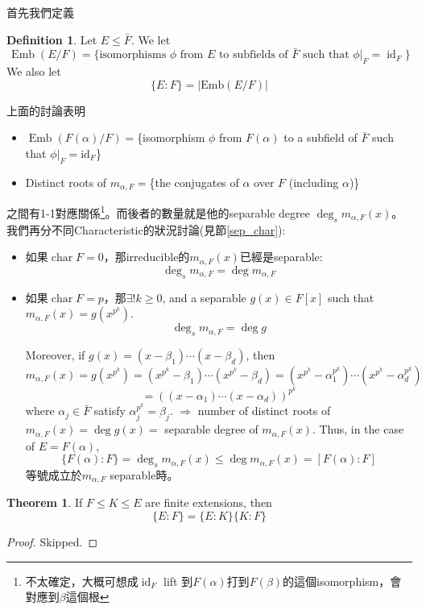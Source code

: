 \documentclass[12pt]{article}
\theoremstyle{definition}
\newtheorem{thm}{Theorem}
\newtheorem{dfn}{Definition}
\DeclareMathOperator{\Char}{char}
\DeclareMathOperator{\id}{id}
\DeclareMathOperator{\Emb}{Emb}
\begin{document}
首先我們定義
\begin{dfn}
	Let $E \leq \bar{F}$. We let
	\[
		\Emb(E/F) =\{
		\text{isomorphisms $\phi$ from $E$ to subfields of $\bar{F}$ such that $\phi|_F = \id_F$}
		\}
	\]
	We also let
	\[\{E:F\} = |\text{Emb}(E/F)|\]
\end{dfn}


上面的討論表明
\begin{itemize}
	\item $\Emb(F(\alpha)/F)=$\{isomorphism $\phi$ from $F(\alpha)$ to a subfield of $\bar{F}$ such that $\phi|_F = \text{id}_F$\}
	\item Distinct roots of $m_{\alpha,F}=$\{the conjugates of $\alpha$ over $F$ (including $\alpha$)\}
\end{itemize}
之間有1-1對應關係\footnote{不太確定，大概可想成$\id_F$ lift 到$F(\alpha)$打到$F(\beta)$的這個isomorphism，會對應到$\beta$這個根}。而後者的數量就是他的separable degree $\deg_s m_{\alpha, F}(x)$。我們再分不同Characteristic的狀況討論(見節\ref{sep_char}):

\begin{itemize}
	\item 如果$\Char F=0$，那irreducible的$m_{\alpha,F}(x)$已經是separable:
	      \[\deg_s m_{\alpha,F} = \deg m_{\alpha,F}\]
	\item 如果$\Char F=p$，那$\exists ! k \geq 0$, and a separable $g(x) \in F[x]$ such that $m_{\alpha, F}(x) = g(x^{p^k})$.
	      \[\deg_s m_{\alpha,F}= \deg g\]


	      Moreover, if $g(x) = (x - \beta_1) \cdots (x - \beta_d)$, then
	      \[
		      m_{\alpha, F}(x) = g(x^{p^k}) = (x^{p^k} - \beta_1) \cdots (x^{p^k} - \beta_d) = (x^{p^k} - \alpha_1^{p^k}) \cdots (x^{p^k} - \alpha_d^{p^k})
	      \]
	      \[
		      = \left( (x - \alpha_1) \cdots (x - \alpha_d) \right)^{p^k}
	      \]
	      where $\alpha_j \in \bar{F}$ satisfy $\alpha_j^{p^k} = \beta_j$.
	      $\Rightarrow$ number of distinct roots of $m_{\alpha, F}(x) = \deg g(x) =$ separable degree of $m_{\alpha, F}(x)$.
	      Thus, in the case of $E = F(\alpha)$,
	      \[
		      \{F(\alpha):F\} = \deg_s m_{\alpha, F}(x) \leq \deg m_{\alpha, F}(x) = [F(\alpha):F]
	      \]
	      等號成立於$m_{\alpha, F}$ separable時。
\end{itemize}


\begin{thm}
	If $F \leq K \leq E$ are finite extensions, then
	\[
		\{E:F\} = \{E:K\}\{K:F\}
	\]
\end{thm}

\begin{proof}
	Skipped.
\end{proof}
\end{document}
